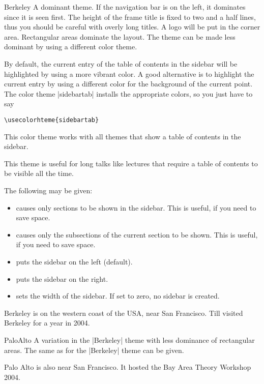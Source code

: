 \begin{themeexample}{Berkeley}
  A dominant theme. If the navigation bar is on the left, it dominates since it is seen first. The height of the frame title is fixed to two and a half lines, thus you should be careful with overly long titles. A logo will be put in the corner area. Rectangular areas dominate the layout. The theme can be made less dominant by using a different color theme.

  By default, the current entry of the table of contents in the sidebar will be highlighted by using a more vibrant color. A good alternative is to highlight the current entry by using a different color for the background of the current point. The color theme |sidebartab| installs the appropriate colors, so you just have to say
\begin{verbatim}
\usecolorhteme{sidebartab}
\end{verbatim}

  This color theme works with all themes that show a table of contents in the sidebar.

  This theme is useful for long talks like lectures that require a table of contents to be visible all the time.

  The following  may be given:
  \begin{itemize}
  \item {} causes only sections to be shown in the sidebar. This is useful, if you need to save space.
  \item {} causes only the subsections of the current section to be shown. This is useful, if you need to save space.
  \item {} puts the sidebar on the left (default).
  \item {} puts the sidebar on the right.
  \item {} sets the width of the sidebar. If set to zero, no sidebar is created.
  \end{itemize}

  Berkeley is on the western coast of the USA, near San Francisco. Till visited Berkeley for a year in 2004.
\end{themeexample}

\begin{themeexample}{PaloAlto}
  A variation in the |Berkeley| theme with less dominance of rectangular areas. The same  as for the |Berkeley| theme can be given.

  Palo Alto is also near San Francisco. It hosted the Bay Area Theory Workshop 2004.
\end{themeexample}

